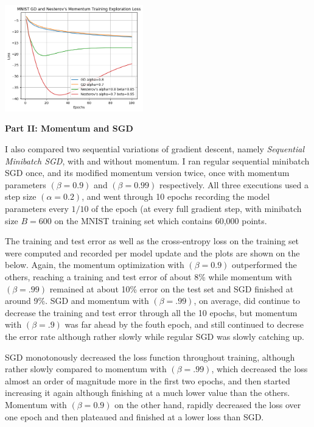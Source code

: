 \documentclass[10pt]{article}
\begin{document}
\begin{multicols}{2}
\begin{center}
\end{center}
\begin{center}
    \includegraphics[width=0.45\textwidth]{GDandNesterov'sMomentumTrainingExplorationLoss.png}
\end{center}

\noindent
\textbf{Part II: Momentum and SGD}\par 
I also compared two sequential variations of gradient descent, namely \textit{Sequential Minibatch SGD}, with and without momentum. I ran regular sequential minibatch SGD once, and its modified momentum version twice, once with momentum parameters $(\beta=0.9)$ and $(\beta=0.99)$ respectively. All three executions used a step size $(\alpha = 0.2)$, and went through 10 epochs recording the model parameters every $1/10$ of the epoch (at every full gradient step, with minibatch size $B=600$ on the MNIST training set which contains 60,000 points.\par
The training and test error as well as the cross-entropy loss on the training set were computed and recorded per model update and the plots are shown on the below. Again, the momentum optimization with $(\beta=0.9)$ outperformed the others, reaching a training and test error of about 8\% while momentum with $(\beta=.99)$ remained at about 10\% error on the test set and SGD finished at around 9\%. SGD and momentum with $(\beta=.99)$, on average, did continue to decrease the training and test error through all the 10 epochs, but momentum with $(\beta=.9)$ was far ahead by the fouth epoch, and still continued to decrese the error rate although rather slowly while regular SGD was slowly catching up. \par
SGD monotonously decreased the loss function throughout training, although rather slowly compared to momentum with $(\beta = .99)$, which decreased the loss almost an order of magnitude more in the first two epochs, and then started increasing it again although finishing at a much lower value than the others. Momentum with $(\beta=0.9)$ on the other hand, rapidly decreased the loss over one epoch and then plateaued and finished at a lower loss than SGD.\par

\end{multicols}
\end{document}
